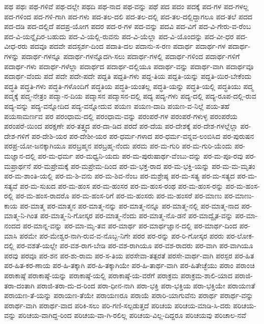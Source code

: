 {ಪಥ
ಪಥಃ
ಪಥ-ಗಳಿವೆ
ಪಥ-ದಲ್ಲೇ
ಪಥದಿ
ಪಥ-ನಾದ
ಪಥ-ವನ್ನು
ಪಥೆ
ಪದ
ಪದಂ
ಪದಕ್ಕೆ
ಪದ-ಗಳ
ಪದ-ಗಳಲ್ಲ
ಪದ-ಗಳಿಂದ
ಪದ-ಗಳಿ-ಗಾಗಿ
ಪದ-ಗಳು
ಪದ-ತಲ-ದಲಿ
ಪದ-ತಲ-ದಲ್ಲಿ
ಪದ-ತಲ-ದಲ್ಲಿದ್ದಾಗಲೂ
ಪದ-ತಲೆ
ಪದದ
ಪದ-ದಡಿ
ಪದ-ದಲ್ಲಿದೆ
ಪದಪ್ರ-ಯೋಗ
ಪದರ
ಪದ-ರ-ಗಳ
ಪದ-ವನ್ನು
ಪದವಿ
ಪದ-ವಿಗೆ
ಪದ-ವಿ-ಗೇರು-ವ-ರೆಂಬ
ಪದ-ವಿ-ಯನ್ನೈದಿರ-ಬಹುದು
ಪದ-ವಿ-ಯಲ್ಲಿ-ರುವನು
ಪದ-ವಿ-ಯೆಲ್ಲಾ
ಪದ-ವಿ-ಯೊಂದನ್ನು
ಪದ-ವೀ-ಧರ
ಪದ-ವೀಧ-ರರು
ಪದವೂ
ಪದವೇ
ಪದಸ್ಪರ್ಶ-ದಿಂದ
ಪದಾತಿ-ದಲ
ಪದಾನು-ಸ-ರಣ
ಪದಾರ್ಥ
ಪದಾರ್ಥ-ಗಳ
ಪದಾರ್ಥ-ಗಳನ್ನು
ಪದಾರ್ಥ-ಗಳನ್ನೂ
ಪದಾರ್ಥ-ಗಳನ್ನೊದಗಿ-ಸಲು
ಪದಾರ್ಥ-ಗಳಲ್ಲಿ
ಪದಾರ್ಥ-ಗಳಿಂದ
ಪದಾರ್ಥ-ಗಳಿಗೆ
ಪದಾರ್ಥ-ಗಳು
ಪದಾರ್ಥ-ಗಳೆಲ್ಲಾ
ಪದಾರ್ಥದ
ಪದಾರ್ಥ-ದಲ್ಲಿಯೂ
ಪದಾರ್ಥ-ವನ್ನು
ಪದಾರ್ಥ-ವಾಗಿ
ಪದಾರ್ಥವೂ
ಪದಾರ್ಥ-ವೆಂದು
ಪದೆ
ಪದೇ
ಪದೇ-ಪದೇ
ಪದ್ದತಿ
ಪದ್ದತಿ-ಗಳು
ಪದ್ದ-ತಿಯ
ಪದ್ದತಿ-ಯನ್ನು
ಪದ್ದತಿ-ಯಿರ-ಬೇಕೆಂದು
ಪದ್ಧತಿ
ಪದ್ಧತಿ-ಗಳು
ಪದ್ಧತಿ-ಗಳೊಂದಿಗೆ
ಪದ್ಧತಿಯ
ಪದ್ಧತಿ-ಯಂತಲ್ಲ
ಪದ್ಧತಿ-ಯನ್ನು
ಪದ್ಧತಿ-ಯಲ್ಲಿ
ಪದ್ಧತಿಯು
ಪದ್ಮ
ಪದ್ಮಕ್ಕೆ
ಪದ್ಮ-ನೇತ್ರಂ
ಪದ್ಮಾ-ನ-ದಿಯ
ಪದ್ಮಾಸನ
ಪದ್ಮಾಸನ-ದಲ್ಲಿ
ಪದ್ಯ
ಪದ್ಯ-ಗಳು
ಪದ್ಯ-ದಲ್ಲಿ
ಪದ್ಯ-ರೂಪ-ದಲ್ಲಿ-ರುವ
ಪದ್ಯ-ವನ್ನು
ಪದ್ಯ-ವನ್ನೋದಿದ
ಪದ್ಯ-ವನ್ನೋದುವ
ಪಯಣ
ಪಯಣ-ದಾದಿ
ಪಯಣ-ವ-ನಿಲ್ಲೆ
ಪಯ-ತಹೆ
ಪಯಸಾಮರ್ಣವ
ಪರ
ಪರಂಧಾಮ-ದಲ್ಲಿ
ಪರಂಧಾಮ-ವನ್ನು
ಪರಂಪರೆ-ಗಳ
ಪರಂಪರೆ-ಗಳುಳ್ಳ
ಪರಂಪರೆಯ
ಪರಂಪರೆ-ಯಿಂದ
ಪರಕ್ಷಣೇ
ಪರ-ತತ್ತ್ವದ
ಪರ-ದಾ-ಡಿದ
ಪರದೆ
ಪರ-ದೆಯ
ಪರ-ದೇಶಕ್ಕೆ
ಪರ-ದೇಶ-ಗಳಲ್ಲೆಲ್ಲಾ
ಪರ-ದೇಶ-ಗಳಿಗೆ
ಪರ-ದೇಶಿ-ಯರ
ಪರ-ದೇಶೀ-ಯರ
ಪರ-ಧರ್ಮ-ಗಳಾದ
ಪರ-ಧರ್ಮ-ವನ್ನವ-ಲಂಬಿಸಿದ
ಪರ-ಪುರುಷನ
ಪರಪ್ರ-ಯೋ-ಜನಕ್ಕಾಗಿಯೂ
ಪರಬ್ರಹ್ಮನ
ಪರಬ್ರಹ್ಮ-ನೆಂದು
ಪರಮ
ಪರ-ಮ-ಗುರಿ
ಪರ-ಮ-ಗುರಿ-ಯೆಂದು
ಪರ-ಮಜ್ಞಾನ-ದಲ್ಲಿ
ಪರ-ಮ-ಧರ್ಮ
ಪರ-ಮಧ್ವನಿ-ಯದು
ಪರ-ಮ-ಪುರುಷಾರ್ಥ-ವೆಂಬು-ದನ್ನು
ಪರ-ಮ-ಪೂ-ರವು
ಪರ-ಮಪ್ರಾರ್ಥನೆ
ಪರ-ಮಪ್ರೇಮಕ್ಕೆ
ಪರ-ಮಪ್ರೇಮ-ದಿಂದ
ಪರ-ಮ-ಭಕ್ತ-ರಾದ
ಪರ-ಮ-ಭಕ್ತಿ-ಯನ್ನು
ಪರ-ಮ-ಮ-ಮೃತಂ
ಪರ-ಮ-ಶಾಂತಿ-ಯಲ್ಲಿ
ಪರ-ಮ-ಶಿ-ವನು
ಪರ-ಮ-ಶಿವ-ನೆಂಬ
ಪರ-ಮಶ್ರೇಷ್ಠ
ಪರ-ಮ-ಸತ್ಯ
ಪರ-ಮ-ಸತ್ಯದ
ಪರ-ಮ-ಸತ್ಯವೆ
ಪರ-ಮ-ಸುಖದ
ಪರ-ಮ-ಹಂಸ
ಪರ-ಮ-ಹಂಸರ
ಪರ-ಮ-ಹಂಸ-ರಂಥ
ಪರ-ಮ-ಹಂಸ-ರನ್ನು
ಪರ-ಮ-ಹಂಸ-ರಲ್ಲಿ
ಪರ-ಮ-ಹಂಸ-ರಾದರೊ
ಪರ-ಮ-ಹಂಸ-ರಿಗೆ
ಪರ-ಮ-ಹಂಸರು
ಪರ-ಮ-ಹಂಸರೆ
ಪರ-ಮಾಣು
ಪರ-ಮಾಣು-ಕಾಯ
ಪರ-ಮಾತ್ಮ
ಪರ-ಮಾತ್ಮನ
ಪರ-ಮಾತ್ಮ-ನನ್ನು
ಪರ-ಮಾತ್ಮ-ನನ್ನೂ
ಪರ-ಮಾತ್ಮ-ನಲ್ಲಿ
ಪರ-ಮಾತ್ಮ-ನಾದ
ಪರ-ಮಾತ್ಮ-ನಿ-ಗಿಂತ
ಪರ-ಮಾತ್ಮ-ನಿ-ಗೋಸ್ಕರ
ಪರ-ಮಾತ್ಮ-ನೆಂದು
ಪರ-ಮಾತ್ಮ-ನೊ-ಡನೆ
ಪರ-ಮಾದ್ವೈತ-ವನ್ನು
ಪರ-ಮಾ-ನಂದದ
ಪರ-ಮಾನ್ನ-ವನ್ನು
ಪರ-ಮಾ-ಮೃ-ತವ
ಪರ-ಮಾರ್ಥ
ಪರ-ಮಾರ್ಥಜ್ಞಾನ-ದಲ್ಲಿ
ಪರ-ಮಾರ್ಥ-ದಿಂದ
ಪರ-ಮಾಸಿ
ಪರಮೇ
ಪರ-ಮೇಶ್ವರ-ನಾಗಿ-ರುವ-ವ-ನೊಬ್ಬ-ನಿಗೇ
ಪರರ
ಪರ-ರನ್ನು
ಪರ-ರಿ-ಗೋಸ್ಕರ
ಪರರು
ಪರ-ಲೋಕ-ದಲ್ಲಿ
ಪರ-ವಶತೆ-ಯಲ್ಲೇ
ಪರ-ವಶ-ರಾಗ-ಬೇಡಿ
ಪರ-ವಶ-ರಾಗಿಯೂ
ಪರ-ವಶ-ರಾದರು
ಪರ-ವಾಗಿ
ಪರ-ವಾಗಿಯೂ
ಪರವು
ಪರವೂ
ಪರ-ಶನ
ಪರ-ಶು-ರಾಮ
ಪರ-ಸ-ತಿಯ
ಪರಸೇವಾ-ತತ್ಪರತೆ
ಪರಸೇ-ವಾರ್ಥ-ವಾಗಿ
ಪರಸ್ಪರ
ಪರ-ಹಿತ
ಪರ-ಹಿತ-ಕರ-ಣಾಯ
ಪರ-ಹಿ-ತಕ್ಕಾಗಿ
ಪರ-ಹಿ-ತಕ್ಕಾಗಿಯೇ
ಪರ-ಹಿ-ತಾರ್ಥ-ವಾಗಿ
ಪರ-ಹಿತೇಚ್ಛೆಯು
ಪರಾಂ
ಪರಾಂಚಿ
ಪರಾಕಾಷ್ಠೆ
ಪರಾಕಾಷ್ಠೆ-ಯನ್ನು
ಪರಾಕಾಷ್ಠೆ-ಯಲ್ಲಿ
ಪರಾಕಾಷ್ಠೆ-ಯ-ವರೆಗೆ
ಪರಾಕ್ರಮ
ಪರಾಕ್ರಮ-ಶಾಲಿ-ಯಾದ
ಪರಾಜಿ-ತರಾ-ದಂತಾಗಿ
ಪರಾಜಿ-ತರಾ-ದು-ದ-ರಿಂದ
ಪರಾ-ಧೀನ-ನಾಗಿ
ಪರಾ-ಭಕ್ತಿ
ಪರಾ-ಭಕ್ತಿಯ
ಪರಾ-ಭಕ್ತಿಯೇ
ಪರಾಯಣತೆ
ಪರಾಯಣ-ತೆ-ಯನ್ನು
ಪರಾಯಣ-ತೆಯೇ
ಪರಾಯಣರೂ
ಪರಾಯೆ
ಪರಾರಿ-ಯಾಗುವೆನು
ಪರಾರ್ಥ
ಪರಾರ್ಥ-ವನ್ನು
ಪರಾರ್ಥ-ವಾಗಿ
ಪರಾರ್ಥ-ವಾದ
ಪರಿಕಿ-ಸಲು
ಪರಿ-ಗಣಿ-ಸಲ್ಪಡುತ್ತದೆ
ಪರಿಚಯ
ಪರಿಚಯ-ಮಾಡಿ-ಸಿ-ದರು
ಪರಿಚಯ-ವನ್ನು
ಪರಿಚಯ-ವಾಗಿದ್ದ-ರಿಂದ
ಪರಿಚಯ-ವಾ-ಗಿ-ರಲಿಲ್ಲ
ಪರಿಚಯ-ವಿಲ್ಲ-ದಿದ್ದರೂ
ಪರಿಚಯವು
ಪರಿಚಾಲ-ನವೆ
}
